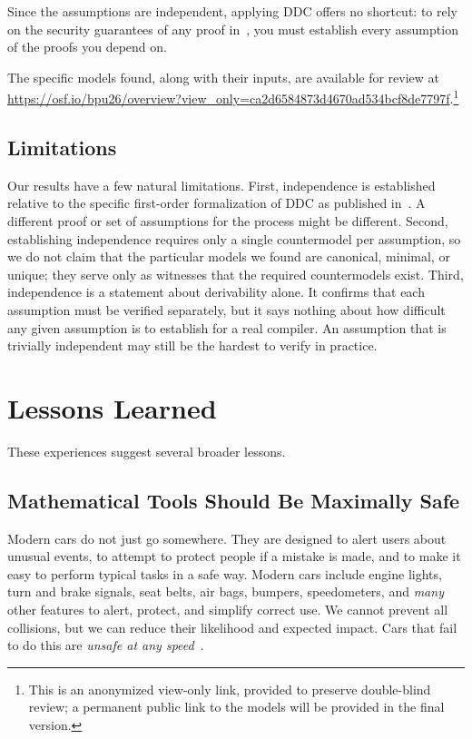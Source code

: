 Since the assumptions are independent, applying DDC offers no shortcut: to rely on the security guarantees of any proof in~\cite{wheeler2010ddc}, you must establish every assumption of the proofs you depend on.

The specific models found, along with their inputs, are available for review at
\url{https://osf.io/bpu26/overview?view_only=ca2d6584873d4670ad534bcf8de7797f}.\footnote{This
is an anonymized view-only link, provided to preserve double-blind review; a
permanent public link to the models will be provided in the final version.}

\subsection{Limitations}

Our results have a few natural limitations. First, independence is established relative to the specific first-order formalization of DDC as published in~\cite{wheeler2010ddc}. A different proof or set of assumptions for the process might be different. Second, establishing independence requires only a single countermodel per assumption, so we do not claim that the particular models we found are canonical, minimal, or unique; they serve only as witnesses that the required countermodels exist. Third, independence is a statement about derivability alone. It confirms that each assumption must be verified separately, but it says nothing about how difficult any given assumption is to establish for a real compiler. An assumption that is trivially independent may still be the hardest to verify in practice.

\section{Lessons Learned}
\label{sec:lessons}

These experiences suggest several broader lessons.

\subsection{Mathematical Tools Should Be Maximally Safe}

Modern cars do not just go somewhere. They are designed to alert users about unusual events, to attempt to protect people if a mistake is made, and to make it easy to perform typical tasks in a safe way. Modern cars include engine lights, turn and brake signals, seat belts, air bags, bumpers, speedometers, and \emph{many} other features to alert, protect, and simplify correct use. We cannot prevent all collisions, but we can reduce their likelihood and expected impact. Cars that fail to do this are \emph{unsafe at any speed}~\cite{nader1965unsafe}.

